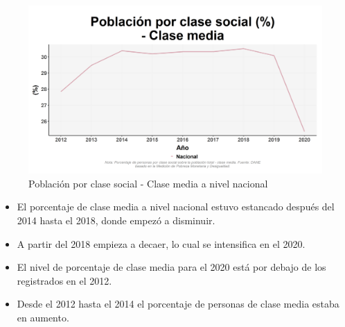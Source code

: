     \begin{figure}[H]
        \caption{Población por clase social - Clase media a nivel nacional \label{map_result_2} }
        \begin{center}
        \includegraphics[width=\textwidth,keepaspectratio]{img/var_248_trend.png}
        \end{center}
    \end{figure}
            \begin{itemize}
                    \item El porcentaje de clase media a nivel nacional estuvo estancado después del 2014 hasta el 2018, donde empezó a disminuir.
                    \item A partir del 2018 empieza a decaer, lo cual se intensifica en el 2020.
                    \item El nivel de porcentaje de clase media para el 2020 está por debajo de los registrados en el 2012.
                    \item Desde el 2012 hasta el 2014 el porcentaje de personas de clase media estaba en aumento.
                    \end{itemize}

